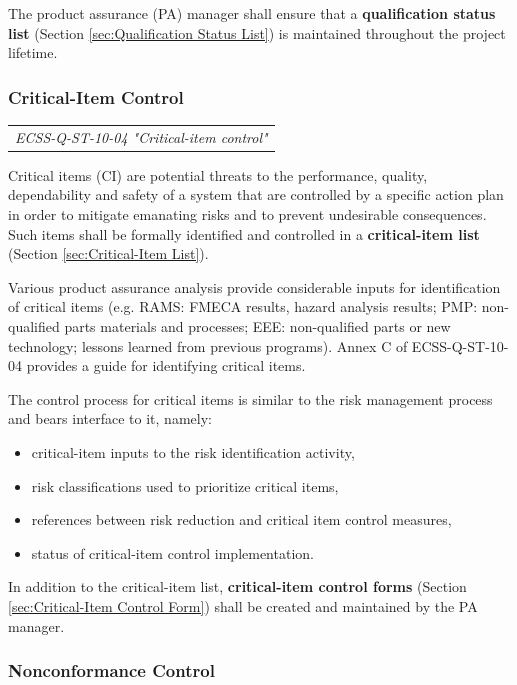 The product assurance (PA) manager shall ensure that a \textbf{qualification status list} (Section \ref{sec:Qualification Status List}) is maintained throughout the project lifetime.

\subsubsection{Critical-Item Control}
\label{sec:Critical-Item Control}

\begin{tabular}{l}
\textit{ECSS-Q-ST-10-04 "Critical-item control" \cite{ECSS-Q-ST-10-04}}
\end{tabular}

Critical items (CI) are potential threats to the performance, quality, dependability and safety of a system that are controlled by a specific action plan in order to mitigate emanating risks and to prevent undesirable consequences. Such items shall be formally identified and controlled in a \textbf{critical-item list} (Section \ref{sec:Critical-Item List}). 

Various product assurance analysis provide considerable inputs for identification of critical items (e.g. RAMS: FMECA results, hazard analysis results; PMP: non-qualified parts materials and processes; EEE: non-qualified parts or new technology; lessons learned from previous programs). Annex C of ECSS-Q-ST-10-04 provides a guide for identifying critical items.

The control process for critical items is similar to the risk management process and bears interface to it, namely:

\begin{itemize}
\item critical-item inputs to the risk identification activity, 
\item risk classifications used to prioritize critical items, 
\item references between risk reduction and critical item control measures, 
\item status of critical-item control implementation. 
\end{itemize}

In addition to the critical-item list, \textbf{critical-item control forms} (Section \ref{sec:Critical-Item Control Form}) shall be created and maintained by the PA manager.

\subsubsection{Nonconformance Control}
\label{sec:Nonconformance Control}

